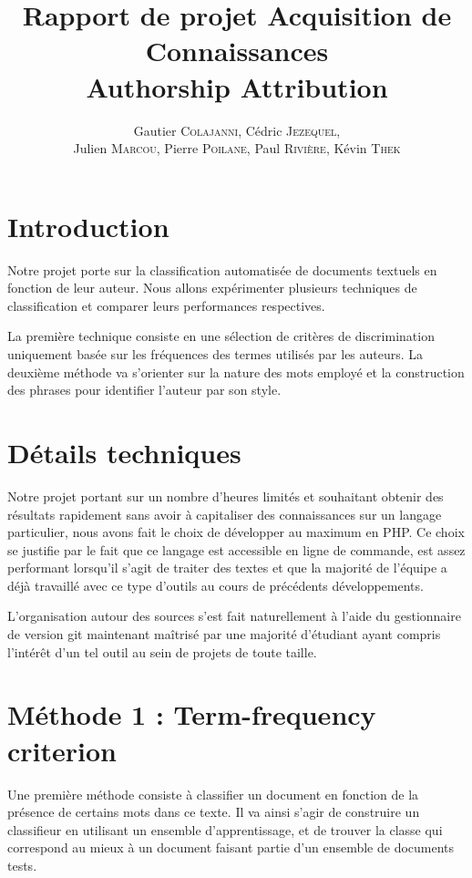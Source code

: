 \documentclass[a4paper]{article}
\author{Gautier \textsc{Colajanni}, Cédric \textsc{Jezequel},\\ Julien \textsc{Marcou}, Pierre \textsc{Poilane}, Paul \textsc{Rivière}, Kévin \textsc{Thek}}
\title{Rapport de projet Acquisition de Connaissances \\ Authorship Attribution}
\begin{document}
\maketitle

\section{Introduction}
Notre projet porte sur la classification automatisée de documents textuels en fonction de leur auteur. Nous allons expérimenter plusieurs techniques de classification et comparer leurs performances respectives.

La première technique consiste en une sélection de critères de discrimination uniquement basée sur les fréquences des termes utilisés par les auteurs. La deuxième méthode va s'orienter sur la nature des mots employé et la construction des phrases pour identifier l'auteur par son style.


\section{Détails techniques}

Notre projet portant sur un nombre d'heures limités et souhaitant obtenir des résultats rapidement sans avoir à capitaliser des connaissances sur un langage particulier, nous avons fait le choix de développer au maximum en PHP. Ce choix se justifie par le fait que ce langage est accessible en ligne de commande, est assez performant lorsqu'il s'agit de traiter des textes et que la majorité de l'équipe a déjà travaillé avec ce type d'outils au cours de précédents développements.

L'organisation autour des sources s'est fait naturellement à l'aide du gestionnaire de version git maintenant maîtrisé par une majorité d'étudiant ayant compris l'intérêt d'un tel outil au sein de projets de toute taille.

\section{Méthode 1 : Term-frequency criterion}
Une première méthode consiste à classifier un document en fonction de la présence de certains mots dans ce texte. Il va ainsi s'agir de construire un classifieur en utilisant un ensemble d'apprentissage, et de trouver la classe qui correspond au mieux à un document faisant partie d'un ensemble de documents tests.
\end{document}
